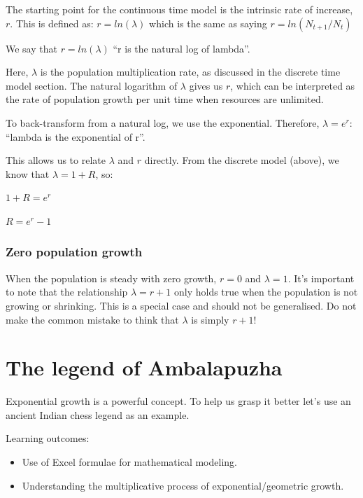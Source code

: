 \documentclass[
  a4paper]{book}
\providecommand{\tightlist}{%
  \setlength{\itemsep}{0pt}\setlength{\parskip}{0pt}}
\begin{document}
The starting point for the continuous time model is the intrinsic rate of increase, \(r\). This is defined as: \(r = ln(\lambda)\) which is the same as saying \(r = ln(N_{t+1}/N_t)\)

We say that \(r = ln(\lambda)\) ``r is the natural log of lambda''.

Here, \(\lambda\) is the population multiplication rate, as discussed in the discrete time model section. The natural logarithm of \(\lambda\) gives us \(r\), which can be interpreted as the rate of population growth per unit time when resources are unlimited.

To back-transform from a natural log, we use the exponential. Therefore, \(\lambda = e^r\): ``lambda is the exponential of r''.

This allows us to relate \(\lambda\) and \(r\) directly. From the discrete model (above), we know that \(\lambda = 1 + R\), so:

\(1+R = e^r\)

\(R = e^r - 1\)

\subsection{Zero population growth}\label{zero-population-growth}

When the population is steady with zero growth, \(r = 0\) and \(\lambda  = 1\). It's important to note that the relationship \(\lambda = r + 1\) only holds true when the population is not growing or shrinking. This is a special case and should not be generalised. Do not make the common mistake to think that \(\lambda\) is simply \(r + 1\)!

\chapter{The legend of Ambalapuzha}\label{the-legend-of-ambalapuzha}

Exponential growth is a powerful concept. To help us grasp it better let's use an ancient Indian chess legend as an example.

\begin{do-something}
Learning outcomes:

\begin{itemize}
\tightlist
\item
  Use of Excel formulae for mathematical modeling.
\item
  Understanding the multiplicative process of exponential/geometric
  growth.
\end{itemize}
\end{do-something}
\end{document}
